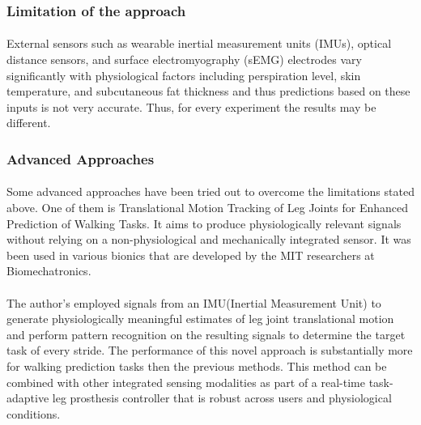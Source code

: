 \documentclass[12pt]{article}
\begin{document}
\subsubsection{Limitation of the approach}
\paragraph{}
External sensors such as wearable inertial measurement units (IMUs), optical distance sensors, and surface electromyography (sEMG) electrodes vary significantly with physiological factors including perspiration level, skin temperature, and subcutaneous fat thickness and thus predictions based on these inputs is not very accurate. Thus, for every experiment the results may be different. 

\subsubsection{Advanced Approaches}
\paragraph{}
Some advanced approaches have been tried out to overcome the limitations stated above. One of them is Translational Motion Tracking of Leg Joints for Enhanced Prediction of Walking Tasks. It aims to produce physiologically relevant signals without relying on a non-physiological and mechanically integrated sensor. It was been used in various bionics that are developed by the MIT researchers at Biomechatronics.

\paragraph{}
The author’s employed signals from an IMU(Inertial Measurement Unit) to generate physiologically meaningful estimates of leg joint translational motion and perform pattern recognition on the resulting signals to determine the target task of every stride. The performance of this novel approach is substantially more for walking prediction tasks then the previous methods. This method can be combined with other integrated sensing
modalities as part of a real-time task-adaptive leg prosthesis controller that is robust across users and physiological conditions. \cite{Roman Stolyarov}

\newpage 
\end{document}
